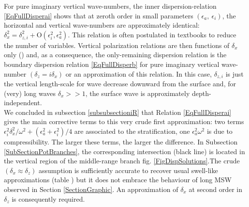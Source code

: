 \documentclass[a4paper,11pt]{article}
\begin{document}

For pure imaginary vertical wave-numbers, the inner dispersion-relation \ref{EqFullDisperai} shows that at zeroth order in small parameters $(\epsilon_a,\ \epsilon_i)$, the horizontal and vertical wave-numbers are approximately identical: $\delta_x^2=\delta_{z,i}^2+\mathrm{O}(\epsilon_i^2,\epsilon_a^2)$. This relation is often postulated in textbooks to reduce the number of variables. Vertical polarization relations are then functions of $\delta_x$ only (\cite{gill_1982}) and, as a consequence, the only-remaining dispersion relation is the boundary dispersion relation \ref{EqFullDisperb} for pure imaginary vertical wave-number $(\delta_z=i\delta_x)$ or an approximation of this relation. In this case, $\delta_{z,i}$ is just the vertical length-scale for wave decrease downward from the surface and, for (very) long waves $\delta_x>>1$, the surface wave is approximately depth-independent.\\
We concluded in subsection \ref{subsubsectioniR} that Relation \ref{EqFullDisperai} gives the main corrective terms to this very crude first approximation: two terms  $\epsilon_i^2 \delta_x^2/\omega^2+(\epsilon_a^2+\epsilon_i^2)/4$ are associated to the stratification, one $\epsilon_a^2\omega^2$ is due to compressibility. The larger these terms, the larger the difference. In Subsection \ref{SubSectionPotBranches}, the corresponding intersection (black line) is located in the vertical region of the middle-range branch fig. \ref{FigDispSolutions}.The crude $(\delta_x\approx\delta_z)$ assumption is sufficiently accurate to recover usual swell-like approximations (table ) but it does not embrace the behaviour of long MSW observed in Section \ref{SectionGraphic}. An approximation of $\delta_x$ at second order in $\delta_z$ is consequently required. 
\end{document}
